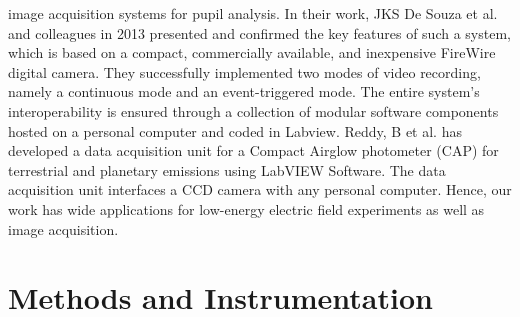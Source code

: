 \documentclass[journal=jacsat,manuscript=article]{achemso}
\begin{document}
image acquisition systems for pupil analysis. In their work, JKS De
Souza et al. \cite{ji2013experimental} and colleagues in 2013
presented and confirmed the key features of such a system, which is
based on a compact, commercially available, and inexpensive FireWire
digital camera. They successfully implemented two modes of video
recording, namely a continuous mode and an event-triggered mode. The
entire system's interoperability is ensured through a collection of
modular software components hosted on a personal computer and coded in
Labview.  Reddy, B et al. \cite{reddy2015development} has developed a
data acquisition unit for a Compact Airglow photometer (CAP) for
terrestrial and planetary emissions using LabVIEW Software. The data
acquisition unit interfaces a CCD camera with any personal computer.
Hence, our work has wide applications for low-energy electric field
experiments as well as image acquisition.
\section{Methods and Instrumentation}
\end{document}
